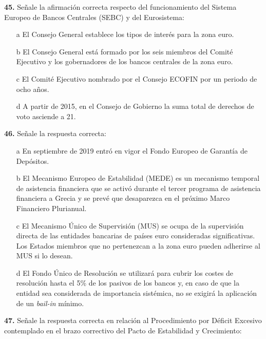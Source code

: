 \documentclass{nuevotema}
\begin{document}
\preguntas


\textbf{45.} Señale la afirmación correcta respecto del funcionamiento del Sistema Europeo de Bancos Centrales (SEBC) y del Eurosistema:

\begin{itemize}
	\item[a] El Consejo General establece los tipos de interés para la zona euro.
	\item[b] El Consejo General está formado por los seis miembros del Comité Ejecutivo y los gobernadores de los bancos centrales de la zona euro.
	\item[c] El Comité Ejecutivo nombrado por el Consejo ECOFIN por un periodo de ocho años.
	\item[d] A partir de 2015, en el Consejo de Gobierno la suma total de derechos de voto asciende a 21.
\end{itemize}

\textbf{46.} Señale la respuesta correcta:

\begin{itemize}
	\item[a] En septiembre de 2019 entró en vigor el Fondo Europeo de Garantía de Depósitos.
	\item[b] El Mecanismo Europeo de Estabilidad (MEDE) es un mecanismo temporal de asistencia financiera que se activó durante el tercer programa de asistencia financiera a Grecia y se prevé que desaparezca en el próximo Marco Financiero Plurianual.
	\item[c] El Mecanismo Único de Supervisión (MUS) se ocupa de la supervisión directa de las entidades bancarias de países euro consideradas significativas. Los Estados miembros que no pertenezcan a la zona euro pueden adherirse al MUS si lo desean.
	\item[d] El Fondo Único de Resolución se utilizará para cubrir los costes de resolución hasta el 5\% de los pasivos de los bancos y, en caso de que la entidad sea considerada de importancia sistémica, no se exigirá la aplicación de un \textit{bail-in} mínimo.
\end{itemize}

\textbf{47.} Señale la respuesta correcta en relación al Procedimiento por Déficit Excesivo contemplado en el brazo correctivo del Pacto de Estabilidad y Crecimiento:
\end{document}
